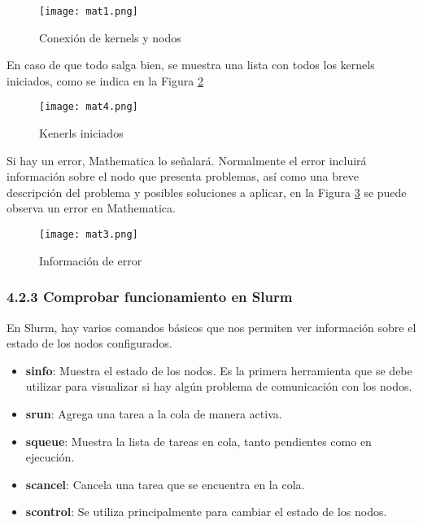 \begin{spacing}{1.5}
  \begin{figure}[h]
    \centering
    \texttt{[image: mat1.png]}
    \caption{Conexión de kernels y nodos}
    \label{fig:etiqueta2}
  \end{figure}

  En caso de que todo salga bien, se muestra una lista con todos los kernels
  iniciados, como se indica en la Figura \ref{fig:etiqueta3}

  \begin{figure}[h]
    \centering
    \texttt{[image: mat4.png]}
    \caption{Kenerls iniciados}
    \label{fig:etiqueta3}
  \end{figure}

  Si hay un error, Mathematica lo señalará. Normalmente el error incluirá
  información sobre el nodo que presenta problemas, así como una breve
  descripción del problema y posibles soluciones a aplicar, en la Figura
  \ref{fig:etiqueta4} se puede observa un error en Mathematica.

  \begin{figure}[h]
    \centering
    \texttt{[image: mat3.png]}
    \caption{Información de error}
    \label{fig:etiqueta4}
  \end{figure}

  \subsubsection {4.2.3 Comprobar funcionamiento en Slurm}

  En Slurm, hay varios comandos básicos que nos permiten ver información sobre
  el
  estado de los nodos configurados.

  \begin{itemize}
    \item \textbf{sinfo}: Muestra el estado de los nodos. Es la primera
          herramienta que se debe utilizar para visualizar si hay algún
          problema de
          comunicación con los nodos.
    \item \textbf{srun}: Agrega una tarea a la cola de manera activa.
    \item \textbf{squeue}: Muestra la lista de tareas en cola, tanto pendientes
          como en ejecución.
    \item \textbf{scancel}: Cancela una tarea que se encuentra en la cola.
    \item \textbf{scontrol}: Se utiliza principalmente para cambiar el estado
          de los nodos.
  \end{itemize}


\end{spacing}
